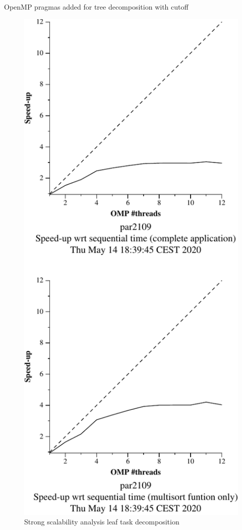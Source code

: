 \begin{listing}[H]
\inputminted[firstline=32,lastline=74]{c}{sources/multisort-omp-tree-cutoff.c}
\caption{OpenMP pragmas added for tree decomposition with cutoff}
\label{listing:omp_tree_cutoff}
\end{listing}

\begin{figure}[H]
    \begin{minipage}{0.5\textwidth}
        \centering
        \includegraphics[width=0.7\linewidth]{plots/new-omp-leaf-crop.pdf}
        \caption{Strong scalability analysis leaf task decomposition}
        \label{fig:ssa_leaf} 
    \end{minipage}

\end{figure}
